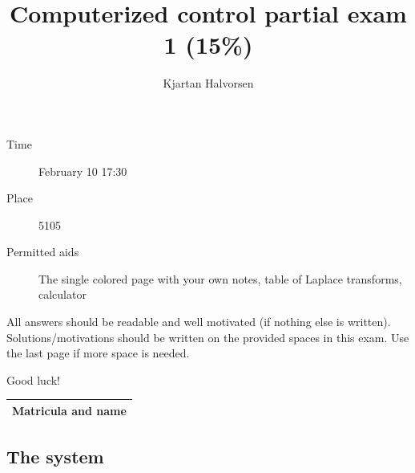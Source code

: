 \documentclass[letter,12pt]{scrartcl}
\title{Computerized control partial exam 1 (15\%)}
\author{Kjartan Halvorsen}
\newcommand{\bmpl}{\begin{minipage}[t]{\textwidth}}
\newcommand{\emp}{\end{minipage}}
\begin{document}
\maketitle


\begin{description}
\item[Time] February 10 17:30
\item[Place] 5105
\item[Permitted aids] The single colored page with your own notes, table of Laplace transforms, calculator
\end{description}

All answers should be readable and well motivated (if nothing else is written). Solutions/motivations should be written on the provided spaces in this exam. Use the last page if more space is needed.

\begin{center}
{\Large Good luck!} \\
\end{center}

\begin{tabular}{|l|l|}
\hline
\multicolumn{2}{|l|}{\bmpl
Matricula and name
\vspace*{18mm}
\emp}\\
\hline

\end{tabular}

\clearpage

\subsection*{The system}
\end{document}
